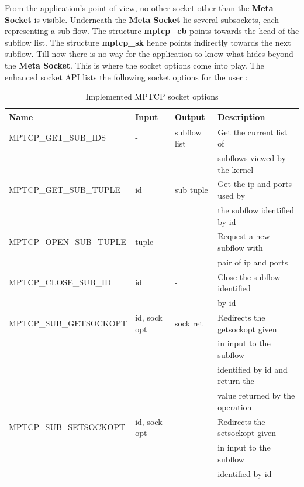 \documentclass[a4paper,11pt]{article}
\begin{document}
			From the application's point of view, no other socket other than the \textbf{Meta Socket} is visible. Underneath the \textbf{Meta Socket} lie several subsockets, each representing a sub flow. The structure \textbf{mptcp\_cb} points towards the head of the subflow list. The structure \textbf{mptcp\_sk} hence points indirectly towards the next subflow.
			Till now there is no way for the application to know what hides beyond the \textbf{Meta Socket}. This is where the socket options come into play. The enhanced socket API lists the following socket options for the user \cite{api}:

			\begin{table}[h]
				
				

				\begin{tabular}{l|l|l|l}
					\hline
					Name & Input & Output & Description \\
					\hline
					\hline
					MPTCP\_GET\_SUB\_IDS & - & subflow list & Get the current list of \\&&&subflows viewed by the kernel \\
					\hline
					MPTCP\_GET\_SUB\_TUPLE & id & sub tuple & Get the ip and ports used by \\&&&the subflow identified by id \\
					\hline
					MPTCP\_OPEN\_SUB\_TUPLE & tuple & - & Request a new subflow with \\&&&pair of ip and ports \\
					\hline
					MPTCP\_CLOSE\_SUB\_ID & id & - & Close the subflow identified \\&&&by id \\
					\hline
					MPTCP\_SUB\_GETSOCKOPT & id, sock opt & sock ret & Redirects the getsockopt given \\&&&in input to the subflow \\&&&identified by id and return the \\&&&value returned by the operation \\
					\hline
					MPTCP\_SUB\_SETSOCKOPT & id, sock opt & - & Redirects the setsockopt given \\&&&in input to the subflow \\&&&identified by id \\
					\hline

				\end{tabular}
				\caption{Implemented MPTCP socket options}
			\end{table}
\end{document}
